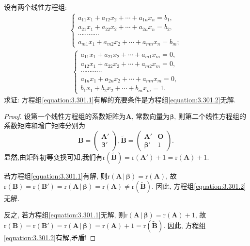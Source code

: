 \documentclass[../../main.tex]{subfiles}%
\begin{document}
\begin{example}
设有两个线性方程组:
\begin{align}\label{equation:3.301.1}
\begin{cases}
a_{11}x_1 + a_{12}x_2+\cdots + a_{1n}x_n = b_1,\\
a_{21}x_1 + a_{22}x_2+\cdots + a_{2n}x_n = b_2,\\
\cdots\cdots\cdots\cdots\\
a_{m1}x_1 + a_{m2}x_2+\cdots + a_{mn}x_n = b_m;
\end{cases} 
\end{align}
\begin{align}\label{equation:3.301.2}
\begin{cases}
a_{11}x_1 + a_{21}x_2+\cdots + a_{m1}x_m = 0,\\
a_{12}x_1 + a_{22}x_2+\cdots + a_{m2}x_m = 0,\\
\cdots\cdots\cdots\cdots\\
a_{1n}x_1 + a_{2n}x_2+\cdots + a_{mn}x_m = 0,\\
b_1x_1 + b_2x_2+\cdots + b_mx_m = 1.
\end{cases}
\end{align}
求证: 方程组\eqref{equation:3.301.1}有解的充要条件是方程组\eqref{equation:3.301.2}无解.
\end{example}
\begin{proof}
设第一个线性方程组的系数矩阵为\(\boldsymbol{A}\), 常数向量为\(\boldsymbol{\beta}\), 则第二个线性方程组的系数矩阵和增广矩阵分别为
\[
\boldsymbol{B}=\begin{pmatrix}
\boldsymbol{A}'\\
\boldsymbol{\beta}'
\end{pmatrix},\widetilde{\boldsymbol{B}}=\begin{pmatrix}
\boldsymbol{A}'&\boldsymbol{O}\\
\boldsymbol{\beta}'&1
\end{pmatrix}.
\]
显然,由矩阵初等变换可知,我们有\(\mathrm{r}(\widetilde{\boldsymbol{B}})=\mathrm{r}(\boldsymbol{A}') + 1=\mathrm{r}(\boldsymbol{A})+1\).

若方程组\eqref{equation:3.301.1}有解, 则\(\mathrm{r}\left( \boldsymbol{A}\,|\,\boldsymbol{\beta } \right) =\mathrm{r}(\boldsymbol{A})\), 故\(\mathrm{r}(\boldsymbol{B})=\mathrm{r}(\boldsymbol{B}')=\mathrm{r}\left( \boldsymbol{A}\,|\,\boldsymbol{\beta } \right) =\mathrm{r}(\boldsymbol{A})\neq\mathrm{r}(\widetilde{\boldsymbol{B}})\). 因此, 方程组\eqref{equation:3.301.2}无解.

反之, 若方程组\eqref{equation:3.301.1}无解, 则\(\mathrm{r}\left( \boldsymbol{A}\,|\,\boldsymbol{\beta } \right) =\mathrm{r}(\boldsymbol{A}) + 1\), 故\(\mathrm{r}(\boldsymbol{B})=\mathrm{r}(\boldsymbol{B}')=\mathrm{r}\left( \boldsymbol{A}\,|\,\boldsymbol{\beta } \right) =\mathrm{r}(\boldsymbol{A})+1=\mathrm{r}(\widetilde{\boldsymbol{B}})\). 因此, 方程组\eqref{equation:3.301.2}有解,矛盾!
\end{proof}
\end{document}
